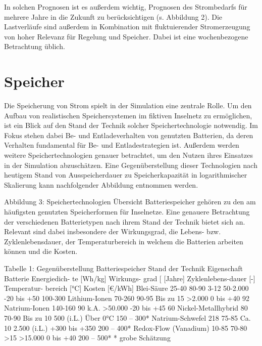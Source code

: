
In solchen Prognosen ist es außerdem wichtig, Prognosen des Strombedarfs für mehrere Jahre in die Zukunft zu berücksichtigen (s. Abbildung 2). Die Lastverläufe sind außerdem in Kombination mit fluktuierender Stromerzeugung von hoher Relevanz für Regelung und Speicher. Dabei ist eine wochenbezogene Betrachtung üblich.

\section{Speicher}

Die Speicherung von Strom spielt in der Simulation eine zentrale Rolle. Um den Aufbau von realistischen Speichersystemen im fiktiven Inselnetz zu ermöglichen, ist ein Blick auf den Stand der Technik solcher Speichertechnologie notwendig. Im Fokus stehen dabei Be- und Entladeverhalten von genutzten Batterien, da deren Verhalten fundamental für Be- und Entladestrategien ist. Außerdem werden weitere Speichertechnologien genauer betrachtet, um den Nutzen ihres Einsatzes in der Simulation abzuschätzen. Eine Gegenüberstellung dieser Technologien nach heutigem Stand von Ausspeicherdauer zu Speicherkapazität in logarithmischer Skalierung kann nachfolgender Abbildung entnommen werden.
 
Abbildung 3: Speichertechnologien Übersicht
Batteriespeicher gehören zu den am häufigsten genutzten Speicherformen für Inselnetze. Eine genauere Betrachtung der verschiedenen Batterietypen nach ihrem Stand der Technik bietet sich an. Relevant sind dabei insbesondere der Wirkungsgrad, die Lebens- bzw. Zyklenlebensdauer, der Temperaturbereich in welchem die Batterien arbeiten können und die Kosten.

Tabelle 1: Gegenüberstellung Batteriespeicher Stand der Technik
Eigenschaft
Batterie 	Energiedich- te [Wh/kg]	Wirkungs- grad [%
[Jahre]	Zyklenlebens-dauer [-]	Temperatur- bereich [°C]	Kosten
[€/kWh]
Blei-Säure	25-40	80-90	3-12	50-2.000	-20 bis +50	100-300
Lithium-Ionen	70-260	90-95	Bis zu 15	>2.000	0 bis +40	92
Natrium-Ionen	140-160	90	k.A.	>50.000	-20 bis +45	60 
Nickel-Metallhybrid	80	70-90	Bis zu 10	500 (i.L.) 	Über 0°C	150 – 300*
Natrium-Schwefel	218	75-85	Ca. 10	2.500 (i.L.)	+300 bis +350	200 – 400*
Redox-Flow (Vanadium)	10-85	70-80	>15	>15.000	0 bis +40	200 – 500*
* grobe Schätzung

